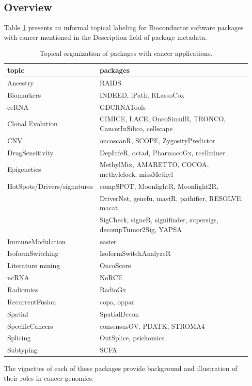 \documentclass[graybox]{svmult}
\begin{document}
\subsection{Overview}\label{overview}

Table \ref{tab:tab-wflow} presents an informal topical
labeling for Bioconductor software packages with
cancer mentioned in the Description field of package
metadata.

\begin{table}
\caption{\label{tab:tab-wflow}Topical organization of packages with cancer applications.}
\begin{tabular}{p{4cm}p{6cm}}
\toprule
topic & packages\\
\midrule
Ancestry & RAIDS\\
Biomarkers & INDEED, iPath, RLassoCox\\
ceRNA & GDCRNATools\\
Clonal Evolution & CIMICE, LACE, OncoSimulR, TRONCO, CancerInSilico, cellscape\\
CNV & oncoscanR, SCOPE, ZygosityPredictor\\
\addlinespace
DrugSensitivity & DepInfeR, octad, PharmacoGx, rcellminer\\
Epigenetics & MethylMix, AMARETTO, COCOA, methylclock, missMethyl\\
HotSpots/Drivers/signatures & compSPOT, MoonlightR, Moonlight2R, \\
 & DriverNet, genefu, mastR, pathifier, RESOLVE, macat, \\
 & SigCheck, signeR, signifinder, supersigs, decompTumor2Sig, YAPSA\\
ImmuneModulation & easier\\
IsoformSwitching & IsoformSwitchAnalyzeR\\
\addlinespace
Literature mining & OncoScore\\
ncRNA & NoRCE\\
Radiomics & RadioGx\\
RecurrentFusion & copa, oppar\\
Spatial & SpatialDecon\\
\addlinespace
SpecificCancers & consensusOV, PDATK, STROMA4\\
Splicing & OutSplice, psichomics\\
Subtyping & SCFA
\end{tabular}
\end{table}

The vignettes of each of these packages provide background and
illustration of their roles in cancer genomics.
\end{document}

